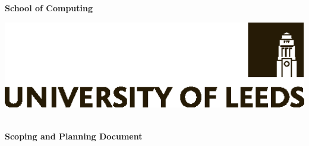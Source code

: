 \begin{minipage}[t]{90mm}
\flushleft
\Huge{\textbf{School of Computing}}
\end{minipage}
\hfill\hfill
\begin{minipage}[t]{70mm}
\flushright
\includegraphics{Leeds_BLACK}
\end{minipage}


\begin{center}
\LARGE{\modulecode}\\
\normalsize{\textbf{Scoping and Planning Document}}
\end{center}

